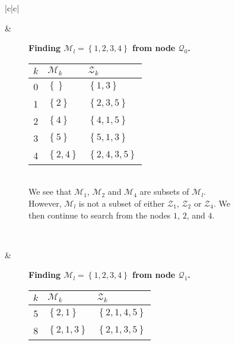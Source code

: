 \begin{figure}
    \centering
    \begin{tabular}{|c|c|}\hline
    \begin{subfigure}[b]{0.35\textwidth}
        \centering
        
    \end{subfigure}
    & 
    \begin{subfigure}[b]{0.64\textwidth}
        \textbf{Finding $\mathcal{M}_l = \left\{{1,2,3,4}\right\}$ from node $\mathcal{Q}_0$.} \\
        \begin{tabular}{rll}
            $k$ & $\mathcal{M}_k$            & $\mathcal{Z}_k$ \\ \hline
            0        & $\left\{{}\right\}$        & $\left\{{1,3}\right\}$ \\ 
            1        & $\left\{{2}\right\}$       & $\left\{{2,3,5}\right\}$ \\ 
            2        & $\left\{{4}\right\}$       & $\left\{{4,1,5}\right\}$ \\ 
            3        & $\left\{{5}\right\}$       & $\left\{{5,1,3}\right\}$ \\ 
            4        & $\left\{{2,4}\right\}$     & $\left\{{2,4,3,5}\right\}$ \\ 
        \end{tabular}
        \\

        We see that $\mathcal{M}_1$, $\mathcal{M}_2$ and $\mathcal{M}_4$ are
        subsets of $\mathcal{M}_l$. However, $\mathcal{M}_l$ is not a subset
        of either $\mathcal{Z}_1$, $\mathcal{Z}_2$ or $\mathcal{Z}_4$.
        We then continue to search from the nodes $1$, $2$, and $4$.
    \end{subfigure}
    \\ \hline
    \begin{subfigure}[b]{0.35\textwidth}
        \centering
        
    \end{subfigure}
    & 
    \begin{subfigure}[b]{0.64\textwidth}
        \textbf{Finding $\mathcal{M}_l = \left\{{1,2,3,4}\right\}$ from node $\mathcal{Q}_1$.} \\
        \begin{tabular}{rll}
            $k$ & $\mathcal{M}_k$            & $\mathcal{Z}_k$ \\ \hline
            5        & $\left\{{2,1}\right\}$     & $\left\{{2,1,4,5}\right\}$ \\ 
            8        & $\left\{{2,1,3}\right\}$   & $\left\{{2,1,3,5}\right\}$ \\ 
        \end{tabular}
        \\


\end{subfigure}
\end{tabular}
\end{figure}
